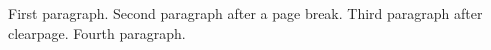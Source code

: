 \documentclass{article}
\begin{document}
First paragraph.
\newpage
Second paragraph after a page break.
\clearpage
Third paragraph after clearpage.
\pagebreak
Fourth paragraph.
\end{document}
